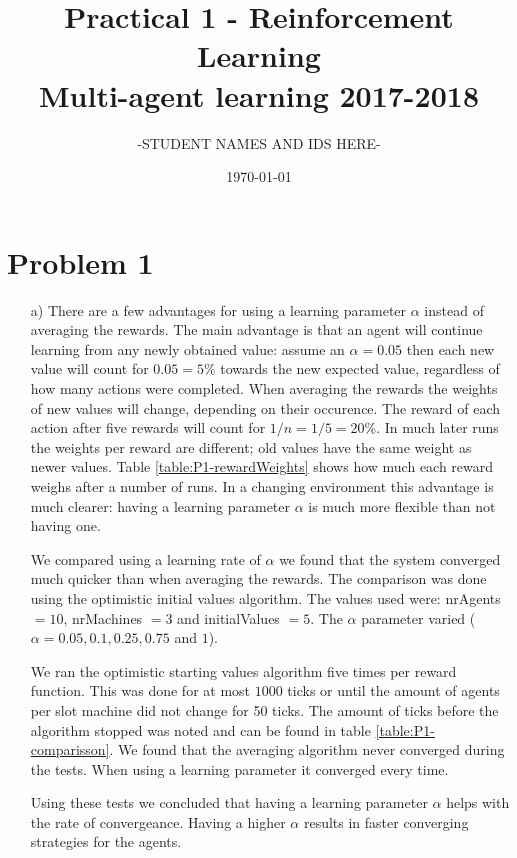 \documentclass[12pt]{article}
\title{Practical 1 - Reinforcement Learning \\
	\large Multi-agent learning 2017-2018}
\author{-STUDENT NAMES AND IDS HERE-}
\date{\today}
\begin{document}
\maketitle

\section*{Problem 1}\label{sec:p1}

\begin{enumerate}
	\item[a)] 						%
	There are a few advantages for using a learning parameter $\alpha$ instead of averaging the rewards.
	The main advantage is that an agent will continue learning from any newly obtained value:
	assume an $\alpha = 0.05$ then each new value will count for $0.05 = 5\%$ towards the new expected value, regardless of how many actions were completed.
	When averaging the rewards the weights of new values will change, depending on their occurence.
	The reward of each action after five rewards will count for $1/n = 1/5 = 20\%$.
	In much later runs the weights per reward are different; old values have the same weight as newer values.
	Table \ref{table:P1-rewardWeights} shows how much each reward weighs after a number of runs.
	In a changing environment this advantage is much clearer:
	having a learning parameter $\alpha$ is much more flexible than not having one.

	We compared using a learning rate of $\alpha$ we found that the system converged much quicker than when averaging the rewards.
	The comparison was done using the optimistic initial values algorithm.
	The values used were:  nrAgents $= 10$, nrMachines $=3$ and initialValues $=5$.
	The $\alpha$ parameter varied ($\alpha = 0.05, 0.1, 0.25, 0.75$ and $1$).

	We ran the optimistic starting values algorithm five times per reward function.
	This was done for at most $1000$ ticks or until the amount of agents per slot machine did not change for 50 ticks.
	The amount of ticks before the algorithm stopped was noted and can be found in table \ref{table:P1-comparisson}.
	We found that the averaging algorithm never converged during the tests.
	When using a learning parameter it converged every time.

	Using these tests we concluded that having a learning parameter $\alpha$ helps with the rate of convergeance.
	Having a higher $\alpha$ results in faster converging strategies for the agents.

\end{enumerate}
\end{document}
